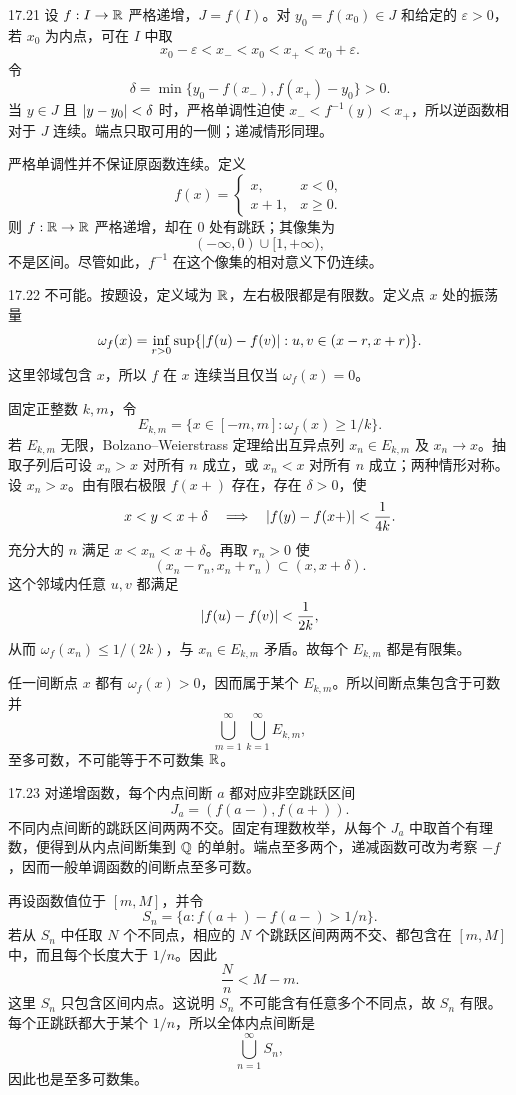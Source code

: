 \begin{solution}{17.21}
设 \(f:I\to\mathbb{R}\) 严格递增，\(J=f(I)\)。对 \(y_0=f(x_0)\in J\) 和给定的 \(\varepsilon>0\)，若 \(x_0\) 为内点，可在 \(I\) 中取
\[
 x_0-\varepsilon<x_-<x_0<x_+<x_0+\varepsilon.
\]
令
\[
 \delta=\min\{y_0-f(x_-),f(x_+)-y_0\}>0.
\]
当 \(y\in J\) 且 \(\left|y-y_0\right|<\delta\) 时，严格单调性迫使
\(x_-<f^{-1}(y)<x_+\)，所以逆函数相对于 \(J\) 连续。端点只取可用的一侧；递减情形同理。

严格单调性并不保证原函数连续。定义
\[
 f(x)=
 \begin{cases}
  x,&x<0,\\
  x+1,&x\ge0.
 \end{cases}
\]
则 \(f:\mathbb{R}\to\mathbb{R}\) 严格递增，却在 \(0\) 处有跳跃；其像集为
\[
 (-\infty,0)\cup[1,+\infty),
\]
不是区间。尽管如此，\(f^{-1}\) 在这个像集的相对意义下仍连续。
\end{solution}

\begin{solution}{17.22}
不可能。按题设，定义域为 \(\mathbb{R}\)，左右极限都是有限数。定义点 \(x\) 处的振荡量
\[
 \omega_f(x)=\inf_{r>0}
 \sup\{\left|f(u)-f(v)\right|:u,v\in(x-r,x+r)\}.
\]
这里邻域包含 \(x\)，所以 \(f\) 在 \(x\) 连续当且仅当 \(\omega_f(x)=0\)。

固定正整数 \(k,m\)，令
\[
 E_{k,m}=\{x\in[-m,m]:\omega_f(x)\ge 1/k\}.
\]
若 \(E_{k,m}\) 无限，Bolzano--Weierstrass 定理给出互异点列
\(x_n\in E_{k,m}\) 及 \(x_n\to x\)。抽取子列后可设 \(x_n>x\) 对所有 \(n\) 成立，或 \(x_n<x\) 对所有 \(n\) 成立；两种情形对称。设 \(x_n>x\)。由有限右极限 \(f(x+)\) 存在，存在 \(\delta>0\)，使
\[
 x<y<x+\delta
 \quad\Longrightarrow\quad
 \left|f(y)-f(x+)\right|<\frac1{4k}.
\]
充分大的 \(n\) 满足 \(x<x_n<x+\delta\)。再取 \(r_n>0\) 使
\[
 (x_n-r_n,x_n+r_n)\subset(x,x+\delta).
\]
这个邻域内任意 \(u,v\) 都满足
\[
 \left|f(u)-f(v)\right|<\frac1{2k},
\]
从而 \(\omega_f(x_n)\le1/(2k)\)，与 \(x_n\in E_{k,m}\) 矛盾。故每个 \(E_{k,m}\) 都是有限集。

任一间断点 \(x\) 都有 \(\omega_f(x)>0\)，因而属于某个 \(E_{k,m}\)。所以间断点集包含于可数并
\[
 \bigcup_{m=1}^{\infty}\bigcup_{k=1}^{\infty}E_{k,m},
\]
至多可数，不可能等于不可数集 \(\mathbb{R}\)。
\end{solution}

\begin{solution}{17.23}
对递增函数，每个内点间断 \(a\) 都对应非空跳跃区间
\[
 J_a=(f(a-),f(a+)).
\]
不同内点间断的跳跃区间两两不交。固定有理数枚举，从每个 \(J_a\) 中取首个有理数，便得到从内点间断集到 \(\mathbb{Q}\) 的单射。端点至多两个，递减函数可改为考察 \(-f\)，因而一般单调函数的间断点至多可数。

再设函数值位于 \([m,M]\)，并令
\[
 S_n=\{a:f(a+)-f(a-)>1/n\}.
\]
若从 \(S_n\) 中任取 \(N\) 个不同点，相应的 \(N\) 个跳跃区间两两不交、都包含在 \([m,M]\) 中，而且每个长度大于 \(1/n\)。因此
\[
 \frac{N}{n}<M-m.
\]
这里 \(S_n\) 只包含区间内点。这说明 \(S_n\) 不可能含有任意多个不同点，故 \(S_n\) 有限。每个正跳跃都大于某个 \(1/n\)，所以全体内点间断是
\[
 \bigcup_{n=1}^{\infty}S_n,
\]
因此也是至多可数集。
\end{solution}

